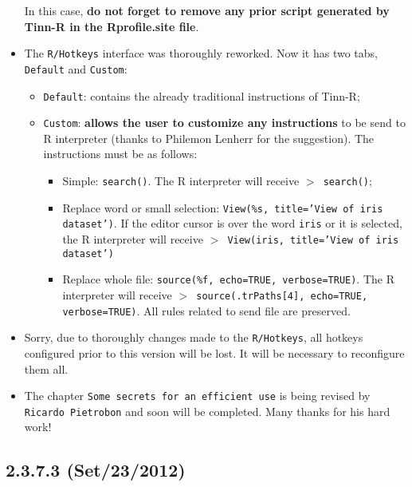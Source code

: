 \begin{itemize}
    In this case, \textbf{do not forget to remove any prior script generated by Tinn-R in the Rprofile.site file}.
  \item The \texttt{R/Hotkeys} interface was thoroughly reworked. Now it has two tabs, \texttt{Default} and \texttt{Custom}:
    \begin{itemize}
      \item \texttt{Default}: contains the already traditional instructions of Tinn-R;
      \item \texttt{Custom}: \textbf{allows the user to customize any instructions} to be send to R interpreter
        (thanks to Philemon Lenherr for the suggestion). The instructions must be as follows:
        \begin{itemize}
          \item Simple: \texttt{search()}. The R interpreter will receive \texttt{$>$ search()};
          \item Replace word or small selection: \texttt{View(\%s, title='View of iris dataset')}.
            If the editor cursor is over the word \texttt{iris} or it is selected,
            the R interpreter will receive \texttt{$>$ View(iris, title='View of iris dataset')}
          \item Replace whole file: \texttt{source(\%f, echo=TRUE, verbose=TRUE)}.
            The R interpreter will receive \texttt{$>$ source(.trPaths[4], echo=TRUE, verbose=TRUE)}.
            All rules related to send file are preserved.
        \end{itemize}
    \end{itemize}
  \item Sorry, due to thoroughly changes made to the \texttt{R/Hotkeys}, all hotkeys configured prior to this version will be lost.
    It will be necessary to reconfigure them all.
  \item The chapter \texttt{Some secrets for an efficient use} is being revised by \texttt{Ricardo Pietrobon} and soon will be completed.
    Many thanks for his hard work!
\end{itemize}

\subsection{2.3.7.3 (Set/23/2012)}

